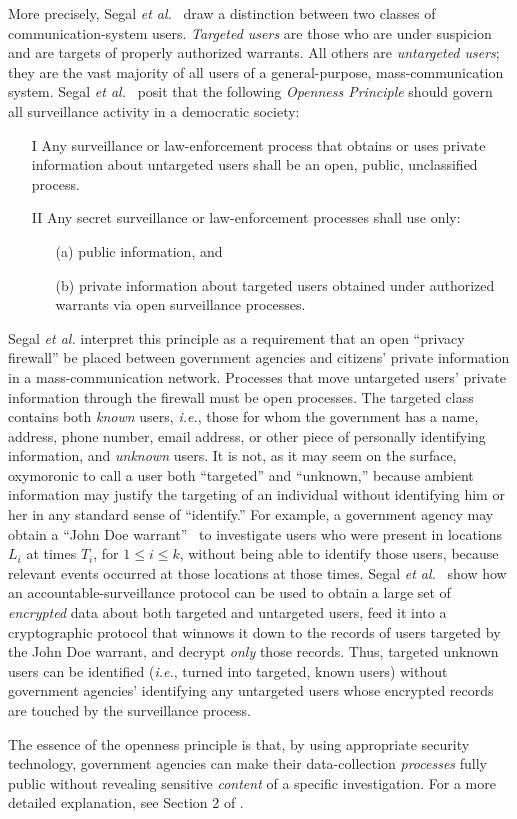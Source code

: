 More precisely, Segal {\it et al.}~\cite{sff-foci2014} draw a distinction 
between two classes of communication-system users.  {\it Targeted users} are 
those who are under suspicion and are targets of properly authorized warrants.
All others are {\it untargeted users}; they are the vast majority of all 
users of a general-purpose, mass-communication system.  Segal {\it et 
al.}~\cite{sff-foci2014} posit that the
following {\it Openness Principle} should govern all surveillance activity
in a democratic society:
\begin{enumerate}
\item[I]
Any surveillance or law-enforcement process
that obtains or uses private information
about untargeted users shall be
an open, public, unclassified process.
\item[II]
Any secret surveillance or law-enforcement processes shall use only:
\begin{enumerate}
\item[(a)] public information, and
\item[(b)] private information about targeted users obtained under 
authorized warrants via open surveillance processes.
\end{enumerate}
\end{enumerate}
Segal {\it et al.} interpret this principle as a requirement that an open
``privacy firewall'' be placed between government agencies and citizens'
private information in a mass-communication network.  Processes that move
untargeted users' private information through the firewall must be open
processes.  The targeted class contains both {\it known} users, {\it i.e.},
those for whom the government has a name, address, phone number, email address,
or other piece of personally identifying information, and {\it unknown} users.
It is not, as it may seem on the surface, oxymoronic to call a user both
``targeted'' and ``unknown,'' because ambient information may justify the
targeting of an individual without identifying him or her in any standard sense
of ``identify.''  For example, a government agency may obtain a ``John Doe
warrant''~\cite{bieber-penn2002} to investigate users who were present in
locations $L_i$ at times $T_i$, for $1\leq i\leq k$, without being able to 
identify those users, because relevant events occurred at those locations at
those times. Segal {\it et al.}~\cite{sff-foci2014} show how an 
accountable-surveillance protocol can be used to obtain a large set of
{\it encrypted} data about both targeted and untargeted users, feed it into a 
cryptographic protocol that winnows it down to the records of users targeted by
the John Doe warrant, and decrypt {\it only} those records.  Thus, targeted
unknown users can be identified ({\it i.e.}, turned into targeted, known users)
without government agencies' identifying any untargeted users whose 
encrypted records are touched by the surveillance process.

The essence of the openness principle is that, by using
appropriate security technology, government agencies can make their 
data-collection {\it processes} fully public without revealing sensitive
{\it content} of a specific investigation.  For a more detailed explanation,
see Section 2 of \cite{sff-foci2014}.

